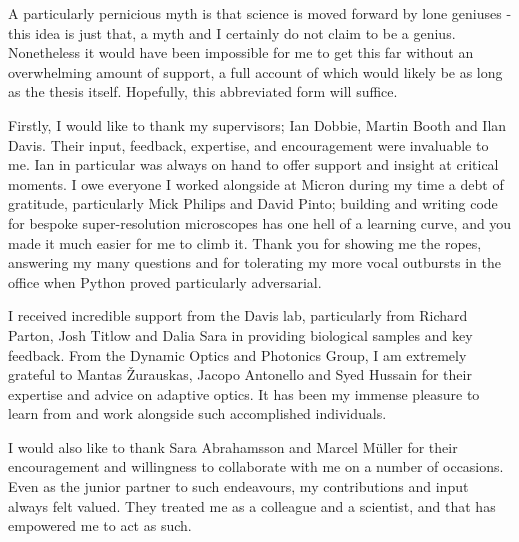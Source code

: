 \begin{acknowledgements}
	
	\vspace{-0.75cm}
	
	{\small %
		
		A particularly pernicious myth is that science is moved forward by lone geniuses - 
		this idea is just that, a myth and I certainly do not claim to be a genius. 
		Nonetheless it would have been impossible for me to get this far without an 
		overwhelming amount of support, a full account of which would likely be as long 
		as the thesis itself. Hopefully, this abbreviated form  will suffice.
		
		Firstly, I would like to thank my supervisors; Ian Dobbie, Martin Booth and Ilan
		Davis. Their input, feedback, expertise, and encouragement were invaluable to me. 
		Ian in particular was always on hand to offer support and insight at critical 
		moments. I owe everyone I worked alongside at Micron during my time a debt 
		of gratitude, particularly Mick Philips and David Pinto; building and writing code 
		for bespoke super-resolution microscopes has one hell of a learning curve, and 
		you made it much easier for me to climb it. Thank you for showing me the ropes,
		answering my many questions and for tolerating my more vocal outbursts in the 
		office when Python proved particularly adversarial. 
		
		I received incredible support from the Davis lab, particularly from Richard Parton, 
		Josh Titlow and Dalia Sara in providing biological samples and key feedback. From 
		the Dynamic Optics and Photonics Group, I am extremely grateful to Mantas 
		\v{Z}urauskas, Jacopo Antonello and Syed Hussain for their expertise and advice 
		on adaptive optics. It has been my immense pleasure to learn from and work 
		alongside such accomplished individuals. 
		
		I would also like to thank Sara Abrahamsson and Marcel M\"{u}ller for their 
		encouragement and willingness to collaborate with me on a number of occasions. 
		Even as the junior partner to such endeavours, my contributions and input always
		felt valued. They treated me as a colleague and a scientist, and that has empowered
		me to act as such.
		
}
\end{acknowledgements}
